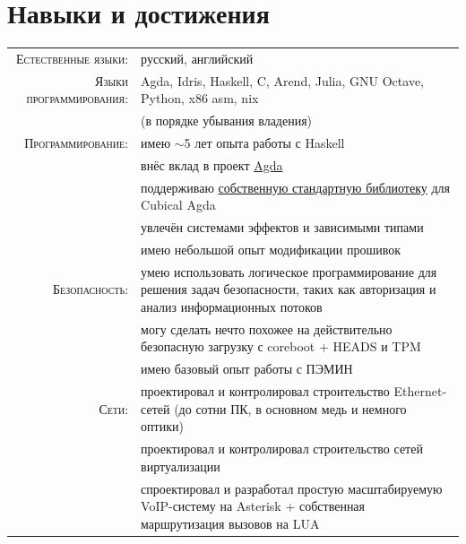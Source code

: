 \documentclass[a4paper,11pt]{article}
\begin{document}
  \section{Навыки и достижения}
    \begin{longtable}{rp{}}
      \textsc{Естественные языки:} & русский, английский \\

      \textsc{Языки программирования:} & Agda, Idris, Haskell, C, Arend, Julia, GNU Octave, Python, x86 asm, nix  \\
                                      & (в порядке убывания владения)                                             \\

      \textsc{Программирование:} & имею $\sim$5 лет опыта работы с Haskell                                                          \\
                                 & внёс вклад в проект \href{https://github.com/agda/agda}{Agda}                                    \\
                                 & поддерживаю \href{https://github.com/cmcmA20/cubical-mini}{собственную стандартную библиотеку}
                                   для Cubical Agda                                                                                 \\
                                 & увлечён системами эффектов и зависимыми типами                                                   \\
                                 & имею небольшой опыт модификации прошивок                                                         \\

      \textsc{Безопасность:} & умею использовать логическое программирование для решения задач безопасности, таких как авторизация
                               и анализ информационных потоков                                                                      \\
                             & могу сделать нечто похожее на действительно безопасную загрузку с coreboot + HEADS и TPM             \\
                             & имею базовый опыт работы с ПЭМИН                                                                     \\

      \textsc{Сети:} & проектировал и контролировал строительство Ethernet-сетей
                       (до сотни ПК, в основном медь и немного оптики)                                           \\
                     & проектировал и контролировал строительство сетей виртуализации                            \\
                     & спроектировал и разработал простую масштабируемую VoIP-систему на Asterisk + собственная
                       маршрутизация вызовов на LUA                                                              \\


\end{longtable}
\end{document}
